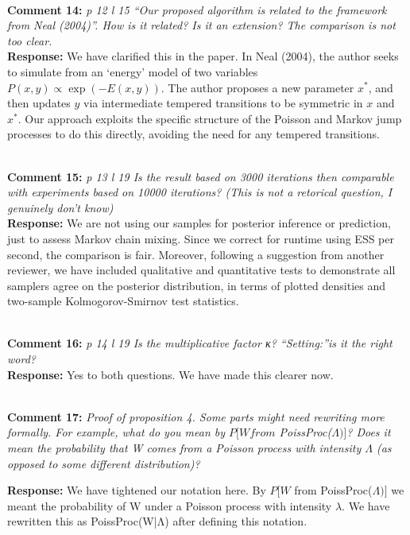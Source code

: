\documentclass[11pt]{article}
\newcommand{\rev}[2]{\textbf{Comment #1: }\emph{#2}}
\newcommand{\resp}{\textbf{Response: }}
\begin{document}
~\\
\rev{14}{p 12 l 15 “Our proposed algorithm is related to the framework from Neal (2004)”. How is it related? Is it an extension? The comparison is not too clear.}\\
\resp We have clarified this in the paper. In Neal (2004), the author seeks to simulate from an `energy' model of two variables $P(x,y) \propto \exp(-E(x,y))$. The author proposes a new parameter $x^*$, and then updates $y$ via intermediate tempered transitions to be symmetric in $x$ and $x^*$. Our approach exploits the specific structure of the Poisson and Markov jump processes to do this directly, avoiding the need for any tempered transitions. 

~\\
\rev{15}{p 13 l 19 Is the result based on 3000 iterations then comparable with experiments based on 10000 iterations? (This is not a retorical question, I genuinely don’t know) }\\
\resp We are not using our samples for posterior inference or prediction, just to assess Markov chain mixing. Since we correct for runtime using ESS per second, the comparison is fair. Moreover, following a suggestion from another reviewer, we have included qualitative and quantitative tests to demonstrate all samplers agree on the posterior distribution, in terms of plotted densities and two-sample Kolmogorov-Smirnov test statistics.

~\\
\rev{16}{p 14 l 19 Is the multiplicative factor κ?   
“Setting:”is it the right word?} \\
\resp Yes to both questions. We have made this clearer now. 

~\\
\rev{17}{Proof of proposition 4. Some parts might need rewriting more formally. For example, what do you mean by $P[W from$ PoissProc($\Lambda)]$? Does it mean the probability that W comes from a Poisson process with intensity $\Lambda$ (as opposed to some different distribution)?}

\noindent \resp We have tightened our notation here. By $P[W$ from PoissProc($\Lambda)]$ we meant the probability of W under a Poisson process with intensity $\lambda$. We have rewritten this as PoissProc(W|Λ) after defining this notation.
\end{document}
